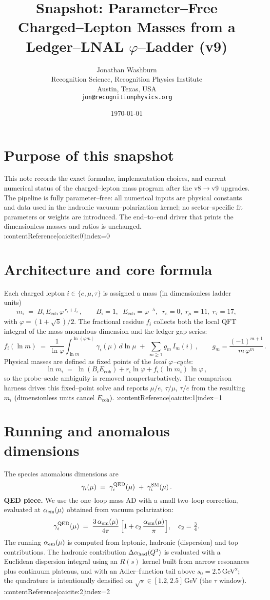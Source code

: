 \documentclass[12pt]{article}
\title{Snapshot: Parameter--Free Charged--Lepton Masses from a Ledger--LNAL $\varphi$--Ladder (v9)}
\author{Jonathan Washburn\\
Recognition Science, Recognition Physics Institute\\
Austin, Texas, USA\\
\texttt{jon@recognitionphysics.org}}
\date{\today}
\begin{document}
\maketitle

\section*{Purpose of this snapshot}
This note records the exact formulae, implementation choices, and current numerical status of the charged--lepton mass program after the v8$\to$v9 upgrades. The pipeline is fully parameter--free: all numerical inputs are physical constants and data used in the hadronic vacuum--polarization kernel; no sector--specific fit parameters or weights are introduced. The end--to--end driver that prints the dimensionless masses and ratios is unchanged. :contentReference[oaicite:0]{index=0}

\section*{Architecture and core formula}
Each charged lepton $i\in\{e,\mu,\tau\}$ is assigned a mass (in dimensionless ladder units)
\[
m_i \;=\; B_i\,E_{\mathrm{coh}}\,\varphi^{\,r_i + f_i}\,,
\qquad
B_i=1,\;\; E_{\mathrm{coh}}=\varphi^{-5},\;\; r_e=0,\; r_\mu=11,\; r_\tau=17,
\]
with $\varphi=(1+\sqrt5)/2$. The fractional residue $f_i$ collects both the local QFT integral of the mass anomalous dimension and the ledger gap series:
\[
f_i(\ln m)\;=\;\frac{1}{\ln\varphi}\int_{\ln m}^{\ln(\varphi m)}\gamma_i(\mu)\,d\ln\mu
\;+\;\sum_{m\ge1} g_m\,I_m(i)\,,
\qquad
g_m=\frac{(-1)^{m+1}}{m\,\varphi^m}\,.
\]
Physical masses are defined as fixed points of the \emph{local $\varphi$--cycle}:
\[
\ln m_i \;=\; \ln(B_iE_{\mathrm{coh}})+r_i\ln\varphi + f_i(\ln m_i)\,\ln\varphi\,,
\]
so the probe--scale ambiguity is removed nonperturbatively. The comparison harness drives this fixed--point solve and reports $\mu/e$, $\tau/\mu$, $\tau/e$ from the resulting $m_i$ (dimensionless units cancel $E_{\mathrm{coh}}$). :contentReference[oaicite:1]{index=1}

\section*{Running and anomalous dimensions}
The species anomalous dimensions are
\[
\gamma_i(\mu)\;=\;\gamma^{\rm QED}_i(\mu)\;+\;\gamma^{\rm SM}_i(\mu)\,.
\]
\textbf{QED piece.} We use the one--loop mass AD with a small two--loop correction, evaluated at $\alpha_{\rm em}(\mu)$ obtained from vacuum polarization:
\[
\gamma^{\rm QED}_i(\mu)\;=\;\frac{3\,\alpha_{\rm em}(\mu)}{4\pi}\,\Bigl[1+c_2\,\frac{\alpha_{\rm em}(\mu)}{\pi}\Bigr],\quad c_2=\tfrac{3}{4}.
\]
The running $\alpha_{\rm em}(\mu)$ is computed from leptonic, hadronic (dispersion) and top contributions. The hadronic contribution $\Delta\alpha_{\rm had}(Q^2)$ is evaluated with a Euclidean dispersion integral using an $R(s)$ kernel built from narrow resonances plus continuum plateaus, and with an Adler--function tail above $s_0=2.5\,$GeV${}^2$; the quadrature is intentionally densified on $\sqrt{s}\!\in\![1.2,2.5]\,$GeV (the $\tau$ window). :contentReference[oaicite:2]{index=2}
\end{document}
